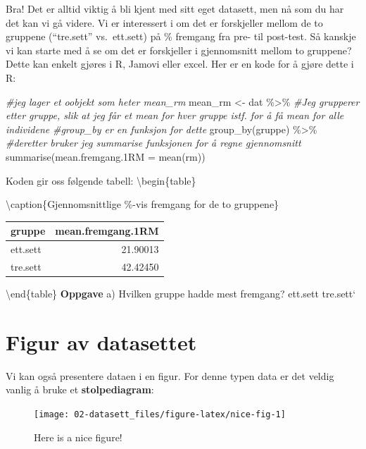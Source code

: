 \documentclass[
]{book}
\newenvironment{Shaded}{\begin{snugshade}}{\end{snugshade}}
\newcommand{\AttributeTok}[1]{\textcolor[rgb]{0.77,0.63,0.00}{#1}}
\newcommand{\CommentTok}[1]{\textcolor[rgb]{0.56,0.35,0.01}{\textit{#1}}}
\newcommand{\FunctionTok}[1]{\textcolor[rgb]{0.00,0.00,0.00}{#1}}
\newcommand{\NormalTok}[1]{#1}
\newcommand{\OtherTok}[1]{\textcolor[rgb]{0.56,0.35,0.01}{#1}}
\newcommand{\SpecialCharTok}[1]{\textcolor[rgb]{0.00,0.00,0.00}{#1}}
\begin{document}
Bra! Det er alltid viktig å bli kjent med sitt eget datasett, men nå som du har det kan vi gå videre. Vi er interessert i om det er forskjeller mellom de to gruppene (``tre.sett'' vs.~ett.sett) på \% fremgang fra pre- til post-test. Så kanskje vi kan starte med å se om det er forskjeller i gjennomsnitt mellom to gruppene? Dette kan enkelt gjøres i R, Jamovi eller excel. Her er en kode for å gjøre dette i R:

\begin{Shaded}
\begin{Highlighting}[]
\CommentTok{\#jeg lager et oobjekt som heter mean\_rm }
\NormalTok{mean\_rm }\OtherTok{\textless{}{-}}\NormalTok{ dat }\SpecialCharTok{\%\textgreater{}\%}
  \CommentTok{\#Jeg grupperer etter gruppe, slik at jeg får et mean for hver gruppe istf. for å få mean for alle individene}
  \CommentTok{\#group\_by er en funksjon for dette}
  \FunctionTok{group\_by}\NormalTok{(gruppe) }\SpecialCharTok{\%\textgreater{}\%}
  \CommentTok{\#deretter bruker jeg summarise funksjonen for å regne gjennomsnitt}
  \FunctionTok{summarise}\NormalTok{(}\AttributeTok{mean.fremgang.1RM =} \FunctionTok{mean}\NormalTok{(rm))}
\end{Highlighting}
\end{Shaded}

Koden gir oss følgende tabell:
\textbackslash begin\{table\}

\textbackslash caption\{\label{tab:unnamed-chunk-6}Gjennomsnittlige \%-vis fremgang for de to gruppene\}
\centering

\begin{tabular}[t]{lr}
\toprule
gruppe & mean.fremgang.1RM\\
\midrule
ett.sett & 21.90013\\
tre.sett & 42.42450\\
\bottomrule
\end{tabular}

\textbackslash end\{table\}
\textbf{Oppgave}
a) Hvilken gruppe hadde mest fremgang?
ett.sett tre.sett`

\hypertarget{figur-av-datasettet}{%
\section{Figur av datasettet}\label{figur-av-datasettet}}

Vi kan også presentere dataen i en figur. For denne typen data er det veldig vanlig å bruke et \textbf{stolpediagram}:

\begin{figure}

{\centering \texttt{[image: 02-datasett\_files/figure-latex/nice-fig-1]} 

}

\caption{Here is a nice figure!}\label{fig:nice-fig}
\end{figure}
\end{document}
